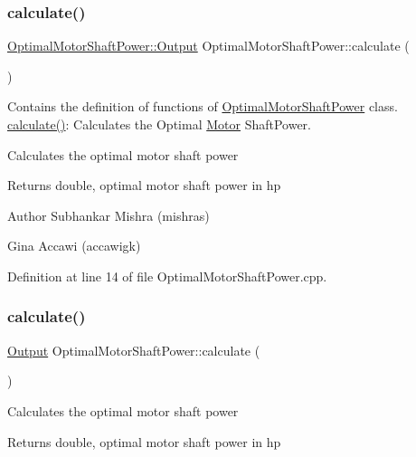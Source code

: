 \subsubsection{\texorpdfstring{calculate()}{calculate()}\hspace{0.1cm}{\footnotesize\ttfamily [1/3]}}
{\footnotesize\ttfamily \hyperlink{struct_optimal_motor_shaft_power_1_1_output}{Optimal\+Motor\+Shaft\+Power\+::\+Output} Optimal\+Motor\+Shaft\+Power\+::calculate (\begin{DoxyParamCaption}{ }\end{DoxyParamCaption})}



Contains the definition of functions of \hyperlink{class_optimal_motor_shaft_power}{Optimal\+Motor\+Shaft\+Power} class. \hyperlink{class_optimal_motor_shaft_power_a486edea429b828e5d989fb32034f4059}{calculate()}\+: Calculates the Optimal \hyperlink{struct_motor}{Motor} Shaft\+Power. 

Calculates the optimal motor shaft power \begin{DoxyReturn}{Returns}
double, optimal motor shaft power in hp
\end{DoxyReturn}
\begin{DoxyAuthor}{Author}
Subhankar Mishra (mishras) 

Gina Accawi (accawigk) 
\end{DoxyAuthor}


Definition at line 14 of file Optimal\+Motor\+Shaft\+Power.\+cpp.

\mbox{\label{class_optimal_motor_shaft_power_a1448024727106660d94faf7f9ff2c89e}} 
\subsubsection{\texorpdfstring{calculate()}{calculate()}\hspace{0.1cm}{\footnotesize\ttfamily [2/3]}}
{\footnotesize\ttfamily \hyperlink{struct_optimal_motor_shaft_power_1_1_output}{Output} Optimal\+Motor\+Shaft\+Power\+::calculate (\begin{DoxyParamCaption}{ }\end{DoxyParamCaption})}

Calculates the optimal motor shaft power \begin{DoxyReturn}{Returns}
double, optimal motor shaft power in hp 
\end{DoxyReturn}
\mbox{\label{class_optimal_motor_shaft_power_a1448024727106660d94faf7f9ff2c89e}} 
